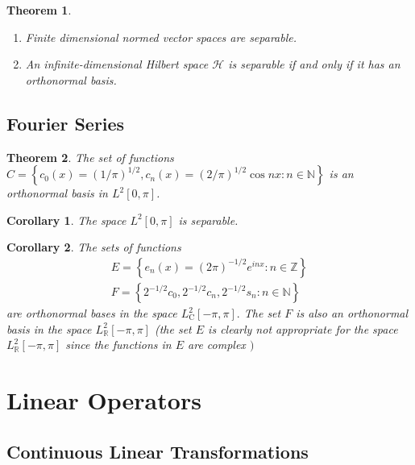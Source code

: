\documentclass[10pt]{paper}
\newtheorem{theorem}{Theorem}[section]
\newtheorem{corollary}{Corollary}[section]
\begin{document}
\begin{theorem}
    \begin{enumerate}
        \item Finite dimensional normed vector spaces are separable.
        \item An infinite-dimensional Hilbert space $\mathcal{H}$ is separable if and only if it has an orthonormal basis.
    \end{enumerate}
\end{theorem}

\subsection{Fourier Series}

\begin{theorem}
    The set of functions $ C=\left\{c_{0}(x)=(1 / \pi)^{1 / 2}, c_{n}(x)=(2 / \pi)^{1 / 2} \cos n x: n \in \mathbb{N}\right\} $ is an orthonormal basis in $L^{2}[0, \pi]$.
\end{theorem}

\begin{corollary}
    The space $L^{2}[0, \pi]$ is separable.
\end{corollary}

\begin{corollary}
    The sets of functions
    $$
        \begin{array}{l}
            E=\left\{e_{n}(x)=(2 \pi)^{-1 / 2} e^{i n x}: n \in \mathbb{Z}\right\} \\
            F=\left\{2^{-1 / 2} c_{0}, 2^{-1 / 2} c_{n}, 2^{-1 / 2} s_{n}: n \in \mathbb{N}\right\}
        \end{array}
    $$
    are orthonormal bases in the space $L_{\mathrm{C}}^{2}[-\pi, \pi] .$ The set $F$ is also an orthonormal basis in the space $L_{\mathbb{R}}^{2}[-\pi, \pi]$ (the set $E$ is clearly not appropriate for the space $L_{\mathbb{R}}^{2}[-\pi, \pi]$ since the functions in $E$ are complex $)$
\end{corollary}

\section{Linear Operators}
\subsection{Continuous Linear Transformations}
\end{document}
